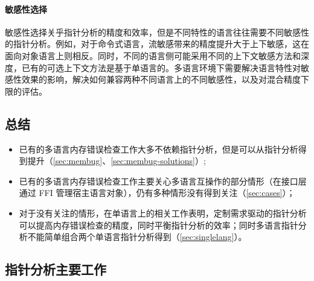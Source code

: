 \paragraph{敏感性选择}
敏感性选择关乎指针分析的精度和效率，但是不同特性的语言往往需要不同敏感性的指针分析。例如，对于命令式语言，流敏感带来的精度提升大于上下敏感，这在面向对象语言上则相反。同时，不同的语言侧可能采用不同的上下文敏感方法和深度，已有的可选上下文方法是基于单语言的。多语言环境下需要解决语言特性对敏感性效果的影响，解决如何兼容两种不同语言上的不同敏感性，以及对混合精度下限的评估。

\subsection{总结}

\begin{itemize}
\item 已有的多语言内存错误检查工作大多不依赖指针分析，但是可以从指针分析得到提升（\autoref{sec:membug}、\autoref{sec:membug-solutions}）;
\item 已有的多语言内存错误检查工作主要关心多语言互操作的部分情形（在接口层通过 FFI 管理宿主语言对象），仍有多种情形没有得到关注（\autoref{sec:cases}）；
\item 对于没有关注的情形，在单语言上的相关工作表明，定制需求驱动的指针分析可以提高内存错误检查的精度，同时平衡指针分析的效率；同时多语言指针分析不能简单组合两个单语言指针分析得到（\autoref{sec:singlelang}）。
\end{itemize}

\subsection{指针分析主要工作}

